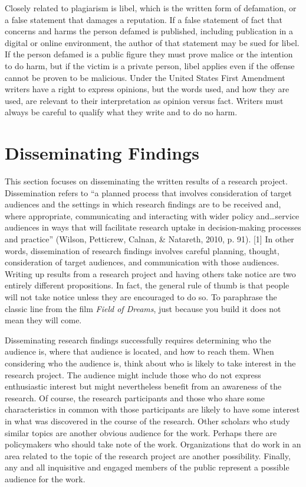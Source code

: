 Closely related to plagiarism is libel, which is the written form of defamation, or a false statement that damages a reputation. If a false statement of fact that concerns and harms the person defamed is published, including publication in a digital or online environment, the author of that statement may be sued for libel. If the person defamed is a public figure they must prove malice or the intention to do harm, but if the victim is a private person, libel applies even if the offense cannot be proven to be malicious. Under the United States First Amendment writers have a right to express opinions, but the words used, and how they are used, are relevant to their interpretation as opinion versus fact. Writers must always be careful to qualify what they write and to do no harm.

\section{Disseminating Findings}

This section focuses on disseminating the written results of a research project. Dissemination refers to ``a planned process that involves consideration of target audiences and the settings in which research findings are to be received and, where appropriate, communicating and interacting with wider policy and…service audiences in ways that will facilitate research uptake in decision-making processes and practice'' (Wilson, Petticrew, Calnan, \& Natareth, 2010, p. 91). [1] In other words, dissemination of research findings involves careful planning, thought, consideration of target audiences, and communication with those audiences. Writing up results from a research project and having others take notice are two entirely different propositions. In fact, the general rule of thumb is that people will not take notice unless they are encouraged to do so. To paraphrase the classic line from the film \textit{Field of Dreams}, just because you build it does not mean they will come.

Disseminating research findings successfully requires determining who the audience is, where that audience is located, and how to reach them. When considering who the audience is, think about who is likely to take interest in the research project. The audience might include those who do not express enthusiastic interest but might nevertheless benefit from an awareness of the research. Of course, the research participants and those who share some characteristics in common with those participants are likely to have some interest in what was discovered in the course of the research. Other scholars who study similar topics are another obvious audience for the work. Perhaps there are policymakers who should take note of the work. Organizations that do work in an area related to the topic of the research project are another possibility. Finally, any and all inquisitive and engaged members of the public represent a possible audience for the work.

